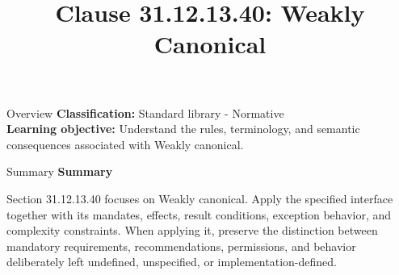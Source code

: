 \documentclass[10pt,letterpaper]{article}
\title{Clause 31.12.13.40: Weakly Canonical}
\author{}
\date{}
\begin{document}
\maketitle
\begin{CornellOverviewBox}{Overview}
\textbf{Classification:} Standard library - Normative\\[2pt]
\textbf{Learning objective:} Understand the rules, terminology, and semantic consequences associated with Weakly canonical.
\end{CornellOverviewBox}\begin{CornellSummaryBox}{Summary}
{\sffamily\bfseries\color{Accent} Summary}\par\vspace{3pt}Section 31.12.13.40 focuses on Weakly canonical. Apply the specified interface together with its mandates, effects, result conditions, exception behavior, and complexity constraints. When applying it, preserve the distinction between mandatory requirements, recommendations, permissions, and behavior deliberately left undefined, unspecified, or implementation-defined.
\end{CornellSummaryBox}
\end{document}
